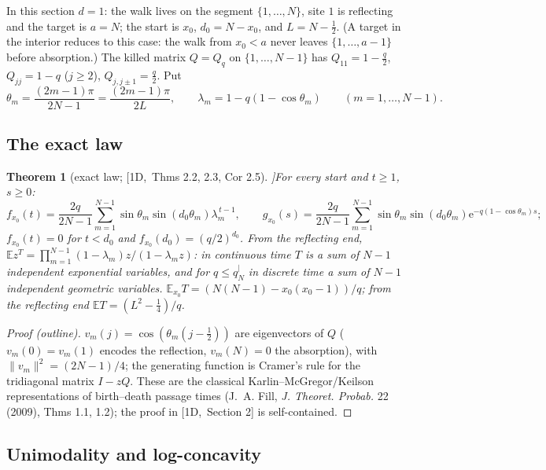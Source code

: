 \documentclass[10pt,a4paper]{article}
\theoremstyle{plain}
\newtheorem{theorem}{Theorem}[section]
\theoremstyle{definition}
\newcommand{\src}[2]{[\textsf{#1},~#2]}           %
\newcommand{\ONE}{\textsf{1D}}
\newcommand{\E}{\mathbb{E}}
\newcommand{\ee}{\mathrm{e}}
\newcommand{\qseg}{q^{|}_N}
\begin{document}
In this section $d=1$: the walk lives on the segment $\{1,\dots,N\}$, site $1$ is reflecting and the target is $a=N$; the start is $x_0$, $d_0=N-x_0$, and $L=N-\frac12$. (A target in the interior reduces to this case: the walk from $x_0<a$ never leaves $\{1,\dots,a-1\}$ before absorption.) The killed matrix $Q=Q_q$ on $\{1,\dots,N-1\}$ has $Q_{11}=1-\frac q2$, $Q_{jj}=1-q$ ($j\ge2$), $Q_{j,j\pm1}=\frac q2$. Put
\[
\theta_m=\frac{(2m-1)\pi}{2N-1}=\frac{(2m-1)\pi}{2L},\qquad \lambda_m=1-q(1-\cos\theta_m)\qquad(m=1,\dots,N-1).
\]

\subsection{The exact law}

\begin{theorem}[exact law; \src{\ONE}{Thms 2.2, 2.3, Cor 2.5}]\label{thm:1d-exact}
For every start and $t\ge1$, $s\ge0$:
\[
f_{x_0}(t)=\frac{2q}{2N-1}\sum_{m=1}^{N-1}\sin\theta_m\sin(d_0\theta_m)\lambda_m^{\,t-1},\qquad g_{x_0}(s)=\frac{2q}{2N-1}\sum_{m=1}^{N-1}\sin\theta_m\sin(d_0\theta_m)\ee^{-q(1-\cos\theta_m)s};
\]
$f_{x_0}(t)=0$ for $t<d_0$ and $f_{x_0}(d_0)=(q/2)^{d_0}$. From the reflecting end, $\E z^T=\prod_{m=1}^{N-1}(1-\lambda_m)z/(1-\lambda_mz)$: in continuous time $T$ is a sum of $N-1$ independent exponential variables, and for $q\le\qseg$ in discrete time a sum of $N-1$ independent geometric variables. $\E_{x_0}T=(N(N-1)-x_0(x_0-1))/q$; from the reflecting end $\E T=(L^2-\frac14)/q$.
\end{theorem}
\begin{proof}[Proof (outline)]
$v_m(j)=\cos(\theta_m(j-\frac12))$ are eigenvectors of $Q$ ($v_m(0)=v_m(1)$ encodes the reflection, $v_m(N)=0$ the absorption), with $\|v_m\|^2=(2N-1)/4$; the generating function is Cramer's rule for the tridiagonal matrix $I-zQ$. These are the classical Karlin--McGregor/Keilson representations of birth--death passage times (J.~A. Fill, \emph{J. Theoret. Probab.} 22 (2009), Thms 1.1, 1.2); the proof in \src{\ONE}{Section 2} is self-contained.
\end{proof}

\subsection{Unimodality and log-concavity}
\end{document}
